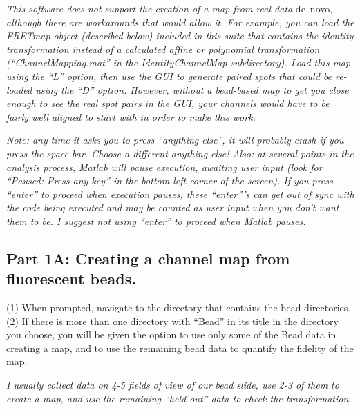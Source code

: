 \documentclass[11pt]{article}
\newcommand{\sj}[1]{\textcolor{red}{#1}}
\begin{document}
{\it This software does not support the creation of a map from real data} de~novo, {\it although there are workarounds that would allow it.  For example, you can load the FRETmap object (described below) included in this suite that contains the identity transformation instead of a calculated affine or polynomial transformation (``ChannelMapping.mat'' in the IdentityChannelMap subdirectory). Load this map using the ``L'' option, then use the GUI to generate paired spots that could be re-loaded using the ``D'' option.  However, without a bead-based map to get you close enough to see the real spot pairs in the GUI, your channels would have to be fairly well aligned to start with in order to make this work.}

{\it Note: any time it asks you to press ``anything else'', it will probably crash if you press the space bar. Choose a different anything else!  Also: at several points in the analysis process, Matlab will pause execution, awaiting user input (look for ``Paused: Press any key'' in the bottom left corner of the screen). If you press ``enter'' to proceed when execution pauses, these ``enter'''s can get out of sync with the code being executed and may be counted as user input when you don't want them to be.  I suggest not using ``enter'' to proceed when Matlab pauses.}

\subsection{Part 1A: Creating a channel map from fluorescent beads.}

(1) When prompted, navigate to the directory that contains the bead directories. \\

\noindent (2) If there is more than one directory with ``Bead'' in its title in the directory you choose, you will be given the option to use only some of the Bead data in creating a map, and to use the remaining bead data to quantify the fidelity of the map. 

{\it I usually collect data on 4-5 fields of view of our bead slide, use 2-3 of them to create a map, and use the remaining ``held-out'' data to check the transformation. }%
\end{document}
